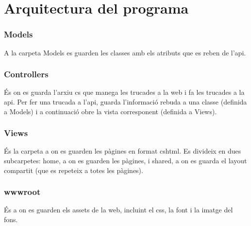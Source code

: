 \section{Arquitectura del programa}

\subsubsection{Models}
A la carpeta Models es guarden les classes amb els atributs que es reben de l'api.

\subsubsection{Controllers}
\'Es on es guarda l'arxiu cs que manega les trucades a la web i fa les trucades a la api.
Per fer una trucada a l'api,
guarda l'informaci\'o rebuda a una classe (definida a Models)
i a continuaci\'o obre la vista corresponent (definida a Views).

\subsubsection{Views}
\'Es la carpeta a on es guarden les p\`agines en format cshtml.
Es divideix en dues subcarpetes: home, a on es guarden les p\`agines,
i shared, a on es guarda el layout compartit (que es repeteix a totes les p\`agines).

\subsubsection{wwwroot}
\'Es a on es guarden els assets de la web,
incluint el css, la font i la imatge del fons.

